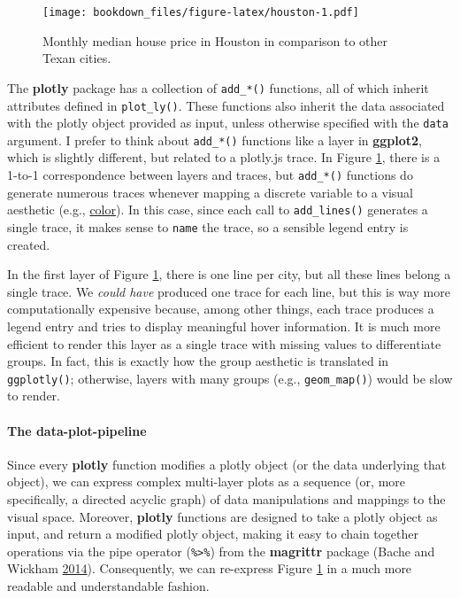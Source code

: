 \documentclass[12pt,]{isuthesis}
\let\oldparagraph\paragraph
\renewcommand{\paragraph}[1]{\oldparagraph{#1}\mbox{}}
\begin{document}
\begin{figure}[htbp]
\centering
\texttt{[image: bookdown\_files/figure-latex/houston-1.pdf]}
\caption{\label{fig:houston}Monthly median house price in Houston in
comparison to other Texan cities.}
\end{figure}

The \textbf{plotly} package has a collection of \texttt{add\_*()}
functions, all of which inherit attributes defined in
\texttt{plot\_ly()}. These functions also inherit the data associated
with the plotly object provided as input, unless otherwise specified
with the \texttt{data} argument. I prefer to think about
\texttt{add\_*()} functions like a layer in \textbf{ggplot2}, which is
slightly different, but related to a plotly.js trace. In Figure
\ref{fig:houston}, there is a 1-to-1 correspondence between layers and
traces, but \texttt{add\_*()} functions do generate numerous traces
whenever mapping a discrete variable to a visual aesthetic (e.g.,
\href{scatterplots-discrete-color}{color}). In this case, since each
call to \texttt{add\_lines()} generates a single trace, it makes sense
to \texttt{name} the trace, so a sensible legend entry is created.

In the first layer of Figure \ref{fig:houston}, there is one line per
city, but all these lines belong a single trace. We \emph{could have}
produced one trace for each line, but this is way more computationally
expensive because, among other things, each trace produces a legend
entry and tries to display meaningful hover information. It is much more
efficient to render this layer as a single trace with missing values to
differentiate groups. In fact, this is exactly how the group aesthetic
is translated in \texttt{ggplotly()}; otherwise, layers with many groups
(e.g., \texttt{geom\_map()}) would be slow to render.

\hypertarget{the-data-plot-pipeline}{\paragraph{The
data-plot-pipeline}\label{the-data-plot-pipeline}}

Since every \textbf{plotly} function modifies a plotly object (or the
data underlying that object), we can express complex multi-layer plots
as a sequence (or, more specifically, a directed acyclic graph) of data
manipulations and mappings to the visual space. Moreover,
\textbf{plotly} functions are designed to take a plotly object as input,
and return a modified plotly object, making it easy to chain together
operations via the pipe operator (\texttt{\%\textgreater{}\%}) from the
\textbf{magrittr} package (Bache and Wickham
\protect\hyperlink{ref-magrittr}{2014}). Consequently, we can re-express
Figure \ref{fig:houston} in a much more readable and understandable
fashion.
\end{document}
